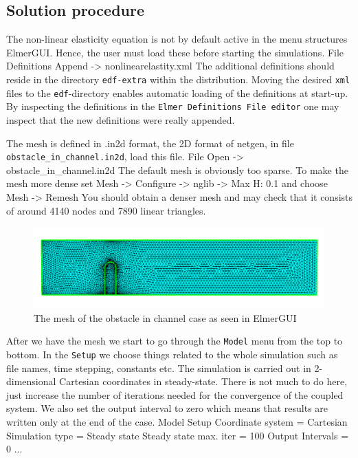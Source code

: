 \subsection*{Solution procedure}


The non-linear elasticity equation is not by default active in the menu structures ElmerGUI. 
Hence, the user must load these before starting the simulations.
\ttbegin
File 
  Definitions
    Append -> nonlinearelastity.xml
\ttend
The additional definitions should reside in the directory \texttt{edf-extra} within the distribution.
Moving the desired \texttt{xml} files to the \texttt{edf}-directory enables automatic loading of the 
definitions at start-up. By inspecting the definitions in the \texttt{Elmer Definitions File editor} one
may inspect that the new definitions were really appended. 


The mesh is defined in .in2d format, the 2D format of 
netgen, in file \texttt{obstacle\_in\_channel.in2d}, load this file.
\ttbegin
File 
  Open -> obstacle\_in\_channel.in2d
\ttend
The default mesh is obviously too sparse. To make the mesh 
more dense set
\ttbegin
Mesh -> Configure -> nglib -> Max H: 0.1 
\ttend
and choose
\ttbegin
Mesh -> Remesh 
\ttend
You should obtain a denser mesh and may check that it consists 
of around 4140 nodes and 7890 linear triangles.

\begin{figure}[h]
\centering
\includegraphics[width=12cm]{fsi_obstacle_gui}
\caption{The mesh of the obstacle in channel case as seen in ElmerGUI}\label{fg:obstacle_in_channel_mesh}
\end{figure} 


After we have the mesh we start to go through the \texttt{Model} menu from the top to bottom. 
In the \texttt{Setup} we choose things related to the whole simulation such as file names, 
time stepping, constants etc.
The simulation is carried out in 2-dimensional Cartesian
coordinates in steady-state. There is not much to do here, just increase the number of iterations needed 
for the convergence of the coupled system. We also set the output interval to zero which means that results are 
written only at the end of the case.
\ttbegin
Model
  Setup 
    Coordinate system = Cartesian
    Simulation type = Steady state
    Steady state max. iter = 100
    Output Intervals = 0
    ...
\ttend

